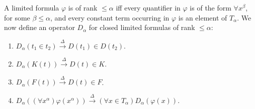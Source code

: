 A limited formula $\varphi$ is of rank $\leq \alpha$ iff every quantifier in $\varphi$ is of the form $\forall x^\beta$, for some $\beta \leq \alpha$, and every constant term occurring in $\varphi$ is an element of $T_\alpha$. We now define an operator $D_\alpha$ for closed limited formulas of rank $\leq \alpha$:
\begin{enumerate}
\item $D_\alpha(t_1 \in t_2) \xrightarrow{\Delta} D(t_1) \in D(t_2)$.
\item $D_\alpha(K(t)) \xrightarrow{\Delta} D(t) \in K$.
\item $D_\alpha(F(t)) \xrightarrow{\Delta} D(t) \in F$.
\item $D_\alpha((\forall x^\alpha)\varphi(x^\alpha)) \xrightarrow{\Delta} (\forall x \in T_\alpha) D_\alpha(\varphi(x))$.
\end{enumerate}
